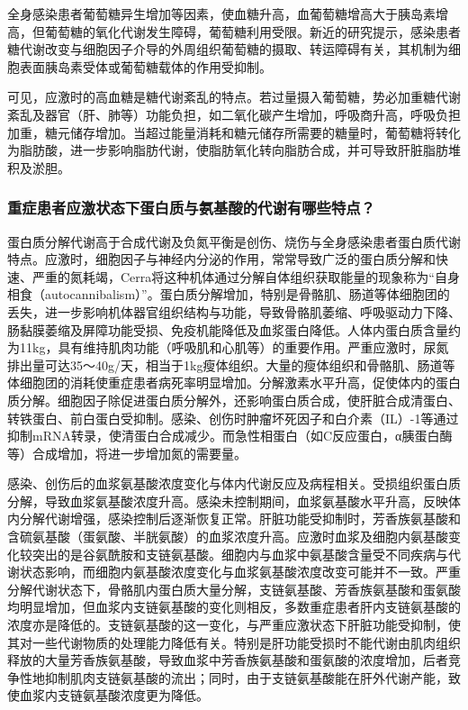 全身感染患者葡萄糖异生增加等因素，使血糖升高，血葡萄糖增高大于胰岛素增高，但葡萄糖的氧化代谢发生障碍，葡萄糖利用受限。新近的研究提示，感染患者糖代谢改变与细胞因子介导的外周组织葡萄糖的摄取、转运障碍有关，其机制为细胞表面胰岛素受体或葡萄糖载体的作用受抑制。

可见，应激时的高血糖是糖代谢紊乱的特点。若过量摄入葡萄糖，势必加重糖代谢紊乱及器官（肝、肺等）功能负担，如二氧化碳产生增加，呼吸商升高，呼吸负担加重，糖元储存增加。当超过能量消耗和糖元储存所需要的糖量时，葡萄糖将转化为脂肪酸，进一步影响脂肪代谢，使脂肪氧化转向脂肪合成，并可导致肝脏脂肪堆积及淤胆。

\subsubsection{重症患者应激状态下蛋白质与氨基酸的代谢有哪些特点？}

蛋白质分解代谢高于合成代谢及负氮平衡是创伤、烧伤与全身感染患者蛋白质代谢特点。应激时，细胞因子与神经内分泌的作用，常常导致广泛的蛋白质分解和快速、严重的氮耗竭，Cerra将这种机体通过分解自体组织获取能量的现象称为“自身相食（autocannibalism）”。蛋白质分解增加，特别是骨骼肌、肠道等体细胞团的丢失，进一步影响机体器官组织结构与功能，导致骨骼肌萎缩、呼吸驱动力下降、肠黏膜萎缩及屏障功能受损、免疫机能降低及血浆蛋白降低。人体内蛋白质含量约为11kg，具有维持肌肉功能（呼吸肌和心肌等）的重要作用。严重应激时，尿氮排出量可达35～40g/天，相当于1kg瘦体组织。大量的瘦体组织和骨骼肌、肠道等体细胞团的消耗使重症患者病死率明显增加。分解激素水平升高，促使体内的蛋白质分解。细胞因子除促进蛋白质分解外，还影响蛋白质合成，使肝脏合成清蛋白、转铁蛋白、前白蛋白受抑制。感染、创伤时肿瘤坏死因子和白介素（IL）-1等通过抑制mRNA转录，使清蛋白合成减少。而急性相蛋白（如C反应蛋白，α胰蛋白酶等）合成增加，将进一步增加氮的需要量。

感染、创伤后的血浆氨基酸浓度变化与体内代谢反应及病程相关。受损组织蛋白质分解，导致血浆氨基酸浓度升高。感染未控制期间，血浆氨基酸水平升高，反映体内分解代谢增强，感染控制后逐渐恢复正常。肝脏功能受抑制时，芳香族氨基酸和含硫氨基酸（蛋氨酸、半胱氨酸）的血浆浓度升高。应激时血浆及细胞内氨基酸变化较突出的是谷氨酰胺和支链氨基酸。细胞内与血浆中氨基酸含量受不同疾病与代谢状态影响，而细胞内氨基酸浓度变化与血浆氨基酸浓度改变可能并不一致。严重分解代谢状态下，骨骼肌内蛋白质大量分解，支链氨基酸、芳香族氨基酸和蛋氨酸均明显增加，但血浆内支链氨基酸的变化则相反，多数重症患者肝内支链氨基酸的浓度亦是降低的。支链氨基酸的这一变化，与严重应激状态下肝脏功能受抑制，使其对一些代谢物质的处理能力降低有关。特别是肝功能受损时不能代谢由肌肉组织释放的大量芳香族氨基酸，导致血浆中芳香族氨基酸和蛋氨酸的浓度增加，后者竞争性地抑制肌肉支链氨基酸的流出；同时，由于支链氨基酸能在肝外代谢产能，致使血浆内支链氨基酸浓度更为降低。

